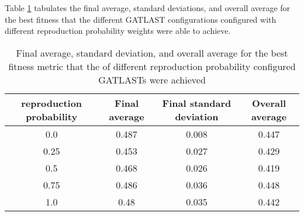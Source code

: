 Table \ref{tab:HP:GA:reproductionProp:best fitness} tabulates the final average, standard deviations, and overall average for the best fitness that the different GATLAST configurations configured with different reproduction probability weights were able to achieve.
\begin{table}[tbh!]
\centering
\begin{adjustbox}{trim=0cm 0cm 0cm 0cm, clip=true}
\begin{tabular}{|c|c|c|c|}
\hline
reproduction probability & Final average & Final standard deviation & Overall average\\
\hline
0.0 & 0.487 & 0.008 & 0.447\\\hline
0.25 & 0.453 & 0.027 & 0.429\\\hline
0.5 & 0.468 & 0.026 & 0.419\\\hline
0.75 & 0.486 & 0.036 & 0.448\\\hline
1.0 & 0.48 & 0.035 & 0.442\\\hline
\end{tabular}
\end{adjustbox}
\caption{Final average, standard deviation, and overall average for the best fitness metric that the of different reproduction probability configured GATLASTs were achieved}
\label{tab:HP:GA:reproductionProp:best fitness}
\end{table}